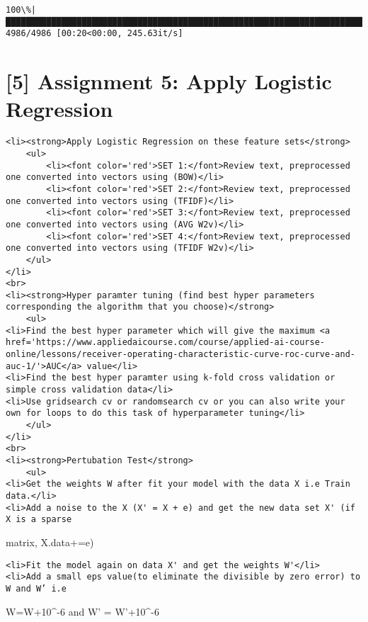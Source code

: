 \documentclass[11pt]{article}
\begin{document}
    \begin{Verbatim}[commandchars=\\\{\}]
100\%|█████████████████████████████████████████████████████████████████████████████| 4986/4986 [00:20<00:00, 245.63it/s]

    \end{Verbatim}

    \section{{[}5{]} Assignment 5: Apply Logistic
Regression}\label{assignment-5-apply-logistic-regression}

    \begin{verbatim}
<li><strong>Apply Logistic Regression on these feature sets</strong>
    <ul>
        <li><font color='red'>SET 1:</font>Review text, preprocessed one converted into vectors using (BOW)</li>
        <li><font color='red'>SET 2:</font>Review text, preprocessed one converted into vectors using (TFIDF)</li>
        <li><font color='red'>SET 3:</font>Review text, preprocessed one converted into vectors using (AVG W2v)</li>
        <li><font color='red'>SET 4:</font>Review text, preprocessed one converted into vectors using (TFIDF W2v)</li>
    </ul>
</li>
<br>
<li><strong>Hyper paramter tuning (find best hyper parameters corresponding the algorithm that you choose)</strong>
    <ul>
<li>Find the best hyper parameter which will give the maximum <a href='https://www.appliedaicourse.com/course/applied-ai-course-online/lessons/receiver-operating-characteristic-curve-roc-curve-and-auc-1/'>AUC</a> value</li>
<li>Find the best hyper paramter using k-fold cross validation or simple cross validation data</li>
<li>Use gridsearch cv or randomsearch cv or you can also write your own for loops to do this task of hyperparameter tuning</li>          
    </ul>
</li>
<br>
<li><strong>Pertubation Test</strong>
    <ul>
<li>Get the weights W after fit your model with the data X i.e Train data.</li>
<li>Add a noise to the X (X' = X + e) and get the new data set X' (if X is a sparse
\end{verbatim}

matrix, X.data+=e)

\begin{verbatim}
<li>Fit the model again on data X' and get the weights W'</li>
<li>Add a small eps value(to eliminate the divisible by zero error) to W and W’ i.e
\end{verbatim}

W=W+10\^{}-6 and W' = W'+10\^{}-6
\end{document}
